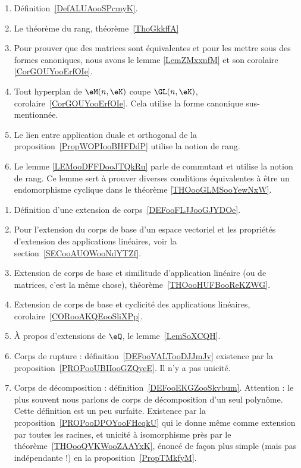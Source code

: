     \begin{enumerate}
        \item Définition~\ref{DefALUAooSPcmyK}.
        \item Le théorème du rang, théorème~\ref{ThoGkkffA}
        \item Pour prouver que des matrices sont équivalentes et pour les mettre sous des formes canoniques, nous avons le lemme \ref{LemZMxxnfM} et son corolaire \ref{CorGOUYooErfOIe}.
        \item Tout hyperplan de \( \eM(n,\eK)\) coupe \( \GL(n,\eK)\), corolaire~\ref{CorGOUYooErfOIe}. Cela utilise la forme canonique sus-mentionnée.
        \item Le lien entre application duale et orthogonal de la proposition~\ref{PropWOPIooBHFDdP} utilise la notion de rang.
        \item Le lemme \ref{LEMooDFFDooJTQkRu} parle de commutant et utilise la notion de rang. Ce lemme sert à prouver diverses conditions équivalentes à être un endomorphisme cyclique dans le théorème \ref{THOooGLMSooYewNxW}.
        \end{enumerate}


 \label{THEMEooZYKFooQXhiPD}
    \begin{enumerate}
        \item
            Définition d'une extension de corps~\ref{DEFooFLJJooGJYDOe}.
        \item
            Pour l'extension du corps de base d'un espace vectoriel et les propriétés d'extension des applications linéaires, voir la section~\ref{SECooAUOWooNdYTZf}.
        \item
            Extension de corps de base et similitude d'application linéaire (ou de matrices, c'est la même chose), théorème~\ref{THOooHUFBooReKZWG}.
        \item
            Extension de corps de base et cyclicité des applications linéaires, corolaire~\ref{CORooAKQEooSliXPp}.
        \item
            À propos d'extensions de \( \eQ\), le lemme~\ref{LemSoXCQH}.
        \item
            Corps de rupture : définition~\ref{DEFooVALTooDJJmJv} existence par la proposition~\ref{PROPooUBIIooGZQyeE}. Il n'y a pas unicité.
        \item
            Corps de décomposition : définition~\ref{DEFooEKGZooSkvbum}. Attention : le plus souvent nous parlons de corps de décomposition d'un seul polynôme. Cette définition est un peu surfaite. Existence par la proposition~\ref{PROPooDPOYooFHcqkU} qui le donne même comme extension par toutes les racines, et unicité à isomorphisme près par le théorème~\ref{THOooQVKWooZAAYxK}, énoncé de façon plus simple (mais pas indépendante !) en la proposition~\ref{PropTMkfyM}.
    \end{enumerate}

